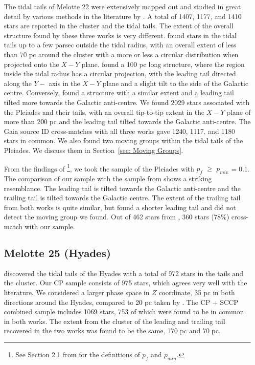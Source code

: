 \documentclass{aa}
\begin{document}
The tidal tails of Melotte 22 were extensively mapped out and studied in great detail by various methods in the literature by \citet {2021RNAAS...5..173Li,2021A&A...645A..84Meingast, 2021MNRAS.505.1607Bhattacharya}. A total of 1407, 1177, and 1410 stars are reported in the cluster and the tidal tails. The extent of the overall structure found by these three works is very different.  \citet{2021RNAAS...5..173Li} found stars in the tidal tails up to a few parsec outside the tidal radius, with an overall extent of less than 70 pc around the cluster with a more or less a circular distribution when projected onto the $X - Y$ plane.  \citet{2021MNRAS.505.1607Bhattacharya} found a 100 pc long structure, where the region inside the tidal radius has a circular projection, with the leading tail directed along the $Y -$ axis in the $X-Y$ plane and a slight tilt to the side of the Galactic centre. Conversely, \citet {2021A&A...645A..84Meingast} found a structure with a similar extent and a leading tail tilted more towards the Galactic anti-centre. We found 2029 stars associated with the Pleiades and their tails, with an overall tip-to-tip extent in the $X-Y$ plane of more than 200 pc and the leading tail tilted  towards the Galactic anti-centre. The Gaia source ID cross-matches with all three works gave 1240, 1117, and 1180 stars in common. We also found two moving groups within the tidal tails of the Pleiades. We discuss them in Section~\ref{sec: Moving Groups}.


From the findings of \citet{2023A&A...679A.105Vaher}\footnote{See Section 2.1 from \citet{2023A&A...679A.105Vaher} for the definitions of $p_f$ and $p_{min}$.}, we took the sample of the Pleiades with $p_f$ $\geq$ $p_{min}$ = 0.1. 
The comparison of our sample with the sample from \citet{2023A&A...679A.105Vaher} shows a striking resemblance. The leading tail is tilted towards the Galactic anti-centre and the trailing tail is tilted towards the Galactic centre. The extent of the trailing tail from both works is quite similar, but \citet{2023A&A...679A.105Vaher} found a shorter leading tail and did not detect the moving group we found.
Out of 462 stars from \citet{2023A&A...679A.105Vaher}, 360 stars (78\%) cross-match with our sample. 


\subsection{Melotte 25 (Hyades)} 
\citet{2019A&A...621L...2Roser_Hyades} discovered the tidal tails of the Hyades with a total of 972 stars in the tails and the cluster. Our CP sample consists of 975 stars, which agrees very well with the literature. We considered a larger phase space in $Z$ coordinate, 35 pc in both directions around the Hyades, compared to 20 pc taken by \citet{2019A&A...621L...2Roser_Hyades}. The CP + SCCP combined sample includes 1069 stars, 753 of which were found to be in common in both works. The extent from the cluster of the leading and trailing tail recovered in the two works was found to be the same, 170 pc and 70 pc. 
\end{document}
